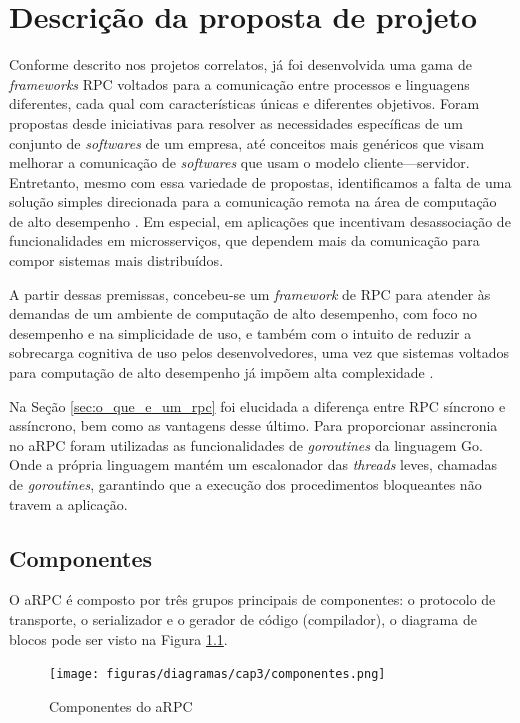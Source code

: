 \chapter{Descrição da proposta de projeto}
\label{chp:capitulo3}

Conforme descrito nos projetos correlatos, já foi desenvolvida uma gama de \textit{frameworks} RPC voltados para a comunicação entre processos e linguagens diferentes, cada qual com características únicas e diferentes objetivos. Foram propostas desde iniciativas para resolver as necessidades específicas de um conjunto de \emph{softwares} de um empresa, até conceitos mais genéricos que visam melhorar a comunicação de \textit{softwares} que usam o modelo cliente---servidor. Entretanto, mesmo com essa variedade de propostas, identificamos a falta de uma solução simples direcionada para a comunicação remota na área de computação de alto desempenho \cite{soumagne2020advancing}. Em especial, em aplicações que incentivam desassociação de funcionalidades em microsserviços, que dependem mais da comunicação para compor sistemas mais distribuídos.

A partir dessas premissas, concebeu-se um \textit{framework} de RPC para atender às demandas de um ambiente de computação de alto desempenho, com foco no desempenho e na simplicidade de uso, e também com o intuito de reduzir a sobrecarga cognitiva de uso pelos desenvolvedores, uma vez que sistemas voltados para computação de alto desempenho já impõem alta complexidade \cite{lynn_addressing_2018}.

Na Seção \ref{sec:o_que_e_um_rpc} foi elucidada a diferença entre RPC síncrono e assíncrono, bem como as vantagens desse último. Para proporcionar assincronia no aRPC foram utilizadas as funcionalidades de \textit{goroutines} da linguagem Go. Onde a própria linguagem mantém um escalonador das \textit{threads} leves, chamadas de \textit{goroutines}, garantindo que a execução dos procedimentos bloqueantes não travem a aplicação.

\section{Componentes}

O aRPC é composto por três grupos principais de componentes: o protocolo de transporte, o serializador e o gerador de código (compilador), o diagrama de blocos pode ser visto na Figura \ref{fig:arpc_components}.

\begin{figure}[ht]
    \centering
    \caption{Componentes do aRPC}
    \texttt{[image: figuras/diagramas/cap3/componentes.png]} 
    \label{fig:arpc_components}
\end{figure}

